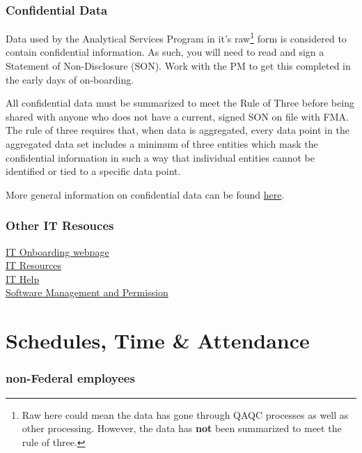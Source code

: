 \documentclass[
  letterpaper,
  DIV=11,
  numbers=noendperiod]{scrreprt}
\begin{document}
\subsubsection{Confidential Data}\label{confidential-data}

Data used by the Analytical Services Program in it's raw\footnote{Raw
  here could mean the data has gone through QAQC processes as well as
  other processing. However, the data has \textbf{not} been summarized
  to meet the rule of three.} form is considered to contain confidential
information. As such, you will need to read and sign a Statement of
Non-Disclosure (SON). Work with the PM to get this completed in the
early days of on-boarding.

All confidential data must be summarized to meet the Rule of Three
before being shared with anyone who does not have a current, signed SON
on file with FMA. The rule of three requires that, when data is
aggregated, every data point in the aggregated data set includes a
minimum of three entities which mask the confidential information in
such a way that individual entities cannot be identified or tied to a
specific data point.

More general information on confidential data can be found
\href{https://sites.google.com/noaa.gov/myafsc/technology/it-security/privacy-impacts}{here}.

\subsubsection{Other IT Resouces}\label{other-it-resouces}

\href{https://sites.google.com/noaa.gov/myafsc/technology/onboarding-and-clearing-it}{IT
Onboarding webpage}\\
\href{https://sites.google.com/noaa.gov/myafsc/technology}{IT
Resources}\\
\href{https://sites.google.com/noaa.gov/myafsc/technology/afsc-it-service-desk}{IT
Help}\\
\href{https://sites.google.com/noaa.gov/myafsc/technology/it-security/software-management}{Software
Management and Permission}

\section{Schedules, Time \& Attendance}\label{schedules-time-attendance}

\subsubsection{non-Federal employees}\label{non-federal-employees}
\end{document}

